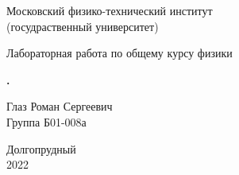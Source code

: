 

\begin{titlepage}

    \newpage
    \begin{center}
        \normalsize Московский физико-технический институт \\
                         (госудраственный университет)
    \end{center}

    \vspace{6em}

    \begin{center}
        \Large Лабораторная работа по общему курсу физики \\
        \labTopic
    \end{center}

    \vspace{1em}

    \begin{center}
        \Large \textbf{\labNumber. \labName}
    \end{center}

    \vspace{2em}

    \begin{center}
        \large Глаз Роман Сергеевич\\
               Группа Б01-008а
    \end{center}

    \vspace{\fill}

    \begin{center}
        Долгопрудный \\
            2022
    \end{center}
    
\end{titlepage}


    \pagestyle{fancy}
    \fancyhead{}
    \fancyhead[L]{\labNumber}
    \fancyfoot[C]{\thepage}
